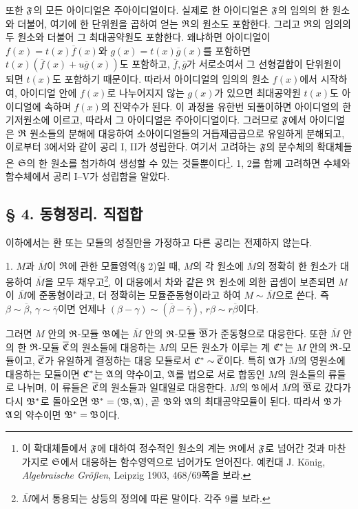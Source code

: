 또한 \(\mathfrak{F}\)의 모든 아이디얼은 주아이디얼이다. 실제로 한 아이디얼은 \(\mathfrak{F}\)의 임의의 한 원소와 더불어, 여기에 한 단위원을 곱하여 얻는 \(\mathfrak{R}\)의 원소도 포함한다. 그리고 \(\mathfrak{R}\)의 임의의 두 원소와 더불어 그 최대공약원도 포함한다. 왜냐하면 아이디얼이 \(f(x)=t(x)\overline f(x)\)와 \(g(x)=t(x)\overline g(x)\)를 포함하면 \(t(x)(\overline f(x)+u\overline g(x))\)도 포함하고, \(\overline f,\overline g\)가 서로소여서 그 선형결합이 단위원이 되면 \(t(x)\)도 포함하기 때문이다. 따라서 아이디얼의 임의의 원소 \(f(x)\)에서 시작하여, 아이디얼 안에 \(f(x)\)로 나누어지지 않는 \(g(x)\)가 있으면 최대공약원 \(t(x)\)도 아이디얼에 속하며 \(f(x)\)의 진약수가 된다. 이 과정을 유한번 되풀이하면 아이디얼의 한 기저원소에 이르고, 따라서 그 아이디얼은 주아이디얼이다. 그러므로 \(\mathfrak{F}\)에서 아이디얼은 \(\mathfrak{R}\) 원소들의 분해에 대응하여 소아이디얼들의 거듭제곱곱으로 유일하게 분해되고, 이로부터 3에서와 같이 공리 I, II가 성립한다. 여기서 고려하는 \(\mathfrak{F}\)의 분수체의 확대체들은 \(\mathfrak S\)의 한 원소를 첨가하여 생성할 수 있는 것들뿐이다\footnote{이 확대체들에서 \(\mathfrak{F}\)에 대하여 정수적인 원소의 계는 \(\mathfrak{R}\)에서 \(\mathfrak{F}\)로 넘어간 것과 마찬가지로 \(\mathfrak S\)에서 대응하는 함수영역으로 넘어가도 얻어진다. 예컨대 J. König, \emph{Algebraische Größen}, Leipzig 1903, 468/69쪽을 보라.}. 1, 2를 함께 고려하면 수체와 함수체에서 공리 I--V가 성립함을 알았다.

\subsection*{§ 4. 동형정리. 직접합}

이하에서는 환 또는 모듈의 성질만을 가정하고 다른 공리는 전제하지 않는다.

1. \(M\)과 \(\overline M\)이 \(\mathfrak{R}\)에 관한 모듈영역(§ 2)일 때, \(M\)의 각 원소에 \(\overline M\)의 정확히 한 원소가 대응하여 \(\overline M\)을 모두 채우고\footnote{\(\overline M\)에서 통용되는 상등의 정의에 따른 말이다. 각주 9를 보라.}, 이 대응에서 차와 같은 \(\mathfrak{R}\) 원소에 의한 곱셈이 보존되면 \(M\)이 \(\overline M\)에 준동형이라고, 더 정확히는 모듈준동형이라고 하여 \(M\sim\overline M\)으로 쓴다. 즉 \(\beta\sim\overline\beta\), \(\gamma\sim\overline\gamma\)이면 언제나 \((\beta-\gamma)\sim(\overline\beta-\overline\gamma)\), \(r\beta\sim r\overline\beta\)이다.

그러면 \(M\) 안의 \(\mathfrak{R}\)-모듈 \(\mathfrak B\)에는 \(\overline M\) 안의 \(\mathfrak{R}\)-모듈 \(\overline{\mathfrak B}\)가 준동형으로 대응한다. 또한 \(\overline M\) 안의 한 \(\mathfrak{R}\)-모듈 \(\overline{\mathfrak{C}}\)의 원소들에 대응하는 \(M\)의 모든 원소가 이루는 계 \(\mathfrak{C}^*\)는 \(M\) 안의 \(\mathfrak{R}\)-모듈이고, \(\overline{\mathfrak{C}}\)가 유일하게 결정하는 대응 모듈로서 \(\mathfrak{C}^*\sim\overline{\mathfrak{C}}\)이다. 특히 \(\mathfrak A\)가 \(\overline M\)의 영원소에 대응하는 모듈이면 \(\mathfrak{C}^*\)는 \(\mathfrak A\)의 약수이고, \(\mathfrak A\)를 법으로 서로 합동인 \(M\)의 원소들의 류들로 나뉘며, 이 류들은 \(\overline{\mathfrak{C}}\)의 원소들과 일대일로 대응한다. \(M\)의 \(\mathfrak B\)에서 \(\overline M\)의 \(\overline{\mathfrak B}\)로 갔다가 다시 \(\mathfrak B^*\)로 돌아오면 \(\mathfrak B^*=(\mathfrak B,\mathfrak A)\), 곧 \(\mathfrak B\)와 \(\mathfrak A\)의 최대공약모듈이 된다. 따라서 \(\mathfrak B\)가 \(\mathfrak A\)의 약수이면 \(\mathfrak B^*=\mathfrak B\)이다.

